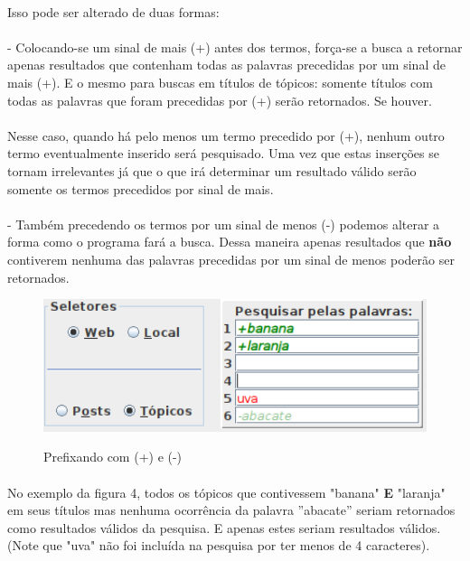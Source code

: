 \documentclass[a4paper,12pt,openany]{book}
\begin{document}
\paragraph{}
Isso pode ser alterado de duas formas:
\paragraph{}
- Colocando-se um sinal de mais (+) antes dos termos, força-se a busca a retornar apenas resultados que contenham todas as palavras precedidas por um sinal de mais (+). E o mesmo para buscas em títulos de tópicos: somente títulos com todas as palavras que foram precedidas por (+) serão retornados. Se houver.
\paragraph{}
Nesse caso, quando há pelo menos um termo precedido por (+), nenhum outro termo eventualmente inserido será pesquisado. Uma vez que estas inserções se tornam irrelevantes já que o que irá determinar um resultado válido serão somente os termos precedidos por sinal de mais.
\paragraph{}
- Também precedendo os termos por um sinal de menos (-) podemos alterar a forma como o programa fará a busca. Dessa maneira apenas resultados que \textbf{não} contiverem nenhuma das palavras precedidas por um sinal de menos poderão ser retornados.

\begin{figure}[h]
	\caption{Prefixando com (+) e (-)}
	
	\centering %
	\includegraphics[width=15cm]{Figuras/outra-forma-de-pesquisar.png} %
	\label{figura:qualquernome}
\end{figure}
\paragraph{}
No exemplo da figura 4, todos os tópicos que contivessem "banana"  \textbf{E} "laranja" em seus títulos mas nenhuma ocorrência da palavra ”abacate” seriam retornados como resultados válidos da pesquisa. E apenas estes
seriam resultados válidos. (Note que "uva" não foi incluída na pesquisa por ter menos de 4 caracteres).
\end{document}
